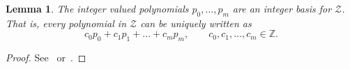 \documentclass[aap,preprint]{imsart}
\newcommand{\ints}{{\mathbb Z}}
\newtheorem{lemma}{Lemma}
\begin{document}
\begin{lemma}\label{lem:intvalpol}
  The integer valued polynomials $p_0,\dots,p_m$ are an integer basis for $\mathcal{Z}$.  That is, every polynomial in $\mathcal{Z}$ can be uniquely written as
\begin{equation} \label{eq:lem_polynomial}
c_0 p_0 + c_1 p_1 + \dots + c_m p_m, \qquad c_0,c_1,\dots,c_m \in \ints.
\end{equation}
\end{lemma}
\begin{proof}
See~\citep[p. 2]{cahen_integer-valued_1997} or~\cite{McKilliam2009IndentifiabliltyAliasingPolyphase}. 
\end{proof}
\end{document}
